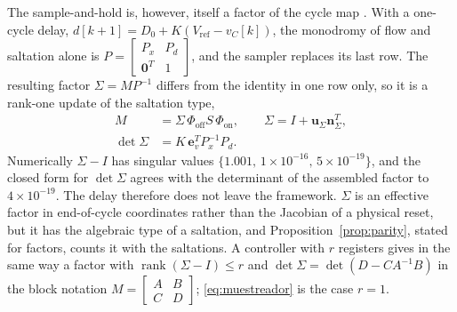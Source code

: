 \documentclass[journal]{IEEEtran}
\begin{document}
The sample-and-hold is, however, itself a factor of the cycle map
\cite{liu2025filippov}. With a
one-cycle delay, $d[k+1]=D_0+K(V_{\mathrm{ref}}-v_C[k])$, the monodromy of
flow and saltation alone is
$P=\left[\begin{smallmatrix}P_x&P_d\\\bm{0}^{T}&1\end{smallmatrix}\right]$,
and the sampler replaces its last row. The resulting factor $\Sigma=MP^{-1}$
differs from the identity in one row only, so it is a rank-one update of the
saltation type,
\begin{equation}
\begin{aligned}
M&=\Sigma\,\Phi_{\mathrm{off}}S\,\Phi_{\mathrm{on}},\qquad
\Sigma=I+\bm{u}_\Sigma\bm{n}_\Sigma^{T},\\
\det\Sigma&=K\,\bm{e}_v^{T}P_x^{-1}P_d .
\end{aligned}
\label{eq:muestreador}
\end{equation}
Numerically $\Sigma-I$ has singular values
$\{1.001,\,1\times10^{-16},\,5\times10^{-19}\}$, and the closed form for
$\det\Sigma$ agrees with the determinant of the assembled factor to
$4\times10^{-19}$. The delay therefore does not leave the framework. $\Sigma$
is an effective factor in end-of-cycle coordinates rather than the Jacobian
of a physical reset, but it has the algebraic type of a saltation, and
Proposition~\ref{prop:parity}, stated for factors, counts it with the
saltations. A controller with $r$ registers gives in the same way a factor
with $\operatorname{rank}(\Sigma-I)\le r$ and $\det\Sigma=\det(D-CA^{-1}B)$
in the block notation $M=\left[\begin{smallmatrix}A&B\\C&D\end{smallmatrix}\right]$;
\eqref{eq:muestreador} is the case $r=1$.
\end{document}
